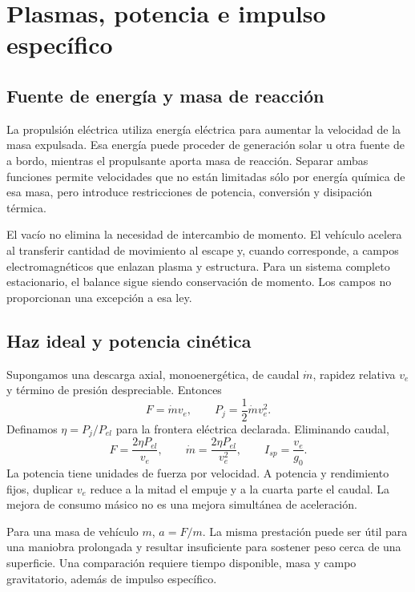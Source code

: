 \chapter{Plasmas, potencia e impulso específico}\label{ch:21}
\section{Fuente de energía y masa de reacción}
La propulsión eléctrica utiliza energía eléctrica para aumentar la velocidad de la masa expulsada. Esa energía puede proceder de generación solar u otra fuente de a bordo, mientras el propulsante aporta masa de reacción. Separar ambas funciones permite velocidades que no están limitadas sólo por energía química de esa masa, pero introduce restricciones de potencia, conversión y disipación térmica.

El vacío no elimina la necesidad de intercambio de momento. El vehículo acelera al transferir cantidad de movimiento al escape y, cuando corresponde, a campos electromagnéticos que enlazan plasma y estructura. Para un sistema completo estacionario, el balance sigue siendo conservación de momento. Los campos no proporcionan una excepción a esa ley.\cite{JPL-EP}
\section{Haz ideal y potencia cinética}
Supongamos una descarga axial, monoenergética, de caudal $\dot m$, rapidez relativa $v_e$ y término de presión despreciable. Entonces
\[
 F=\dot m v_e,\qquad P_j=\frac12\dot m v_e^2.
\]
Definamos $\eta=P_j/P_{el}$ para la frontera eléctrica declarada. Eliminando caudal,
\begin{equation}\label{eq:EP}
 \boxed{F=\frac{2\eta P_{el}}{v_e}},\qquad
 \boxed{\dot m=\frac{2\eta P_{el}}{v_e^2}},\qquad I_{sp}=\frac{v_e}{g_0}.
\end{equation}
La potencia tiene unidades de fuerza por velocidad. A potencia y rendimiento fijos, duplicar $v_e$ reduce a la mitad el empuje y a la cuarta parte el caudal. La mejora de consumo másico no es una mejora simultánea de aceleración.

Para una masa de vehículo $m$, $a=F/m$. La misma prestación puede ser útil para una maniobra prolongada y resultar insuficiente para sostener peso cerca de una superficie. Una comparación requiere tiempo disponible, masa y campo gravitatorio, además de impulso específico.

